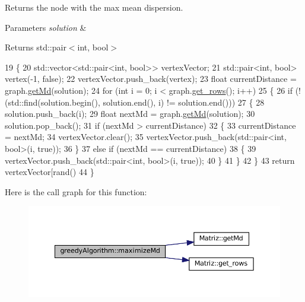 Returns the node with the max mean dispersion. 


\begin{DoxyParams}{Parameters}
{\em solution} & \\
\hline
\end{DoxyParams}
\begin{DoxyReturn}{Returns}
std\+::pair$<$int, bool$>$ 
\end{DoxyReturn}

\begin{DoxyCode}
19 \{
20   std::vector<std::pair<int, bool>> vertexVector;
21   std::pair<int, bool> vertex(-1, \textcolor{keyword}{false});
22   vertexVector.push\_back(vertex);
23   \textcolor{keywordtype}{float} currentDistance = graph.\hyperlink{classMatriz_a8df14a27d791f24206dd633b2a685c5b}{getMd}(solution);
24   \textcolor{keywordflow}{for} (\textcolor{keywordtype}{int} i = 0; i < graph.\hyperlink{classMatriz_a6b18342f8c083baece693ff41185a206}{get\_rows}(); i++)
25   \{
26     \textcolor{keywordflow}{if} (!(std::find(solution.begin(), solution.end(), i) != solution.end()))
27     \{
28       solution.push\_back(i);
29       \textcolor{keywordtype}{float} nextMd = graph.\hyperlink{classMatriz_a8df14a27d791f24206dd633b2a685c5b}{getMd}(solution);
30       solution.pop\_back();
31       \textcolor{keywordflow}{if} (nextMd > currentDistance)
32       \{
33         currentDistance = nextMd;
34         vertexVector.clear();
35         vertexVector.push\_back(std::pair<int, bool>(i, \textcolor{keyword}{true}));
36       \}
37       \textcolor{keywordflow}{else} \textcolor{keywordflow}{if} (nextMd == currentDistance)
38       \{
39         vertexVector.push\_back(std::pair<int, bool>(i, \textcolor{keyword}{true}));
40       \}
41     \}
42   \}
43   \textcolor{keywordflow}{return} vertexVector[rand() %
44 \}
\end{DoxyCode}
Here is the call graph for this function\+:\nopagebreak
\begin{figure}[H]
\begin{center}
\leavevmode
\includegraphics[width=350pt]{classgreedyAlgorithm_a4968e1371d2fdfb1b1b6f24b57dd1f07_cgraph}
\end{center}
\end{figure}

